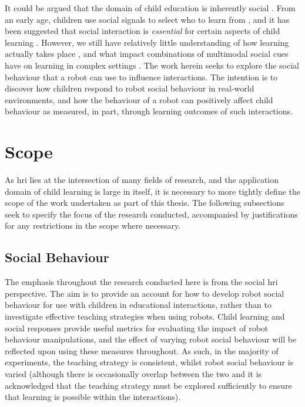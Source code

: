 It could be argued that the domain of child education is inherently social \citep{bandura1977social,vygotsky1980mind}. From an early age, children use social signals to select who to learn from \citep{birch2008three,wu2010no}, and it has been suggested that social interaction is \textit{essential} for certain aspects of child learning \citep{kuhl2007speech}. However, we still have relatively little understanding of how \gls{learning} actually takes place \citep{vanlehn2003only}, and what impact combinations of multimodal social cues have on \gls{learning} in complex settings \citep{roth2002up}. The work herein seeks to explore the social behaviour that a robot can use to influence interactions. The intention is to discover how children respond to robot social behaviour in real-world environments, and how the behaviour of a robot can positively affect child behaviour as measured, in part, through \gls{learning} outcomes of such interactions.

\section{Scope}\label{sec:intro-scope}
As \acrshort{hri} lies at the intersection of many fields of research, and the application domain of child \gls{learning} is large in itself, it is necessary to more tightly define the scope of the work undertaken as part of this thesis. The following subsections seek to specify the focus of the research conducted, accompanied by justifications for any restrictions in the scope where necessary.

\subsection{Social Behaviour} \label{sec:scope-social}
The emphasis throughout the research conducted here is from the social \acrshort{hri} perspective. The aim is to provide an account for how to develop robot social behaviour for use with children in educational interactions, rather than to investigate effective teaching strategies when using robots. Child \gls{learning} and social responses provide useful metrics for evaluating the impact of robot behaviour manipulations, and the effect of varying robot social behaviour will be reflected upon using these measures throughout. As such, in the majority of experiments, the teaching strategy is consistent, whilst robot social behaviour is varied (although there is occasionally overlap between the two and it is acknowledged that the teaching strategy must be explored sufficiently to ensure that \gls{learning} is possible within the interactions).

